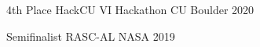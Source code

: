 
\begin{cvhonors}

  \cvhonor
    {4th Place} 
    {HackCU VI Hackathon}
    {CU Boulder}
    {2020}

  \cvhonor
    {Semifinalist} 
    {RASC-AL}
    {NASA}
    {2019}

\end{cvhonors}
